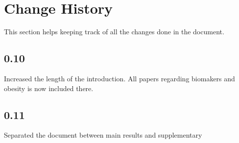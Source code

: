 \documentclass[10pt, a4paper, onecolumn]{article} %
\begin{document}





\newpage

\section{Change History}

This section helps keeping track of all the changes done in the document.\\

\subsection*{0.10}

Increased the length of the introduction. All papers regarding biomakers and obesity is now included there.

\subsection*{0.11}

Separated the document between main results and supplementary
\end{document}
